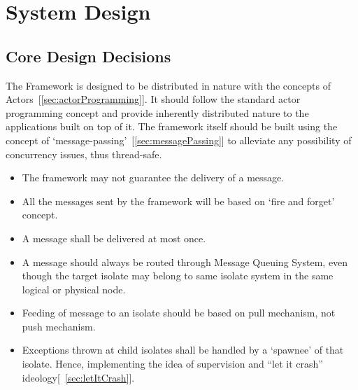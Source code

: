 \chapter{System Design}\label{chapter:general_design_decisions}

\section{Core Design Decisions}
The Framework is designed to be distributed in nature with the concepts of Actors~[\autoref{sec:actorProgramming}]. It should follow the standard actor programming concept and provide inherently distributed nature to the applications built on top of it. The framework itself should be built using the concept of ‘message-passing’~[\autoref{sec:messagePassing}] to alleviate any possibility of concurrency issues, thus thread-safe.

\begin{itemize}
  \item The framework may not guarantee the delivery of a message.
  \item All the messages sent by the framework will be based on ‘fire and forget’ concept.
  \item A message shall be delivered at most once.
  \item A message should always be routed through Message Queuing System, even though the target isolate may belong to same isolate system in the same logical or physical node.
  \item Feeding of message to an isolate should be based on pull mechanism, not push mechanism.
  \item Exceptions thrown at child isolates shall be handled by a ‘spawnee’ of that isolate. Hence, implementing the idea of supervision and “let it crash” ideology[~\autoref{sec:letItCrash}].
\end{itemize}

